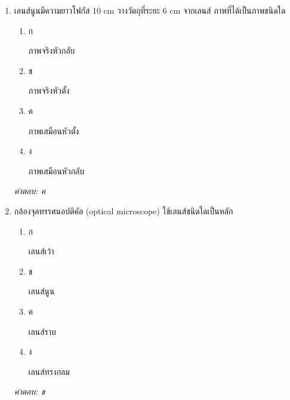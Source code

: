 \documentclass[12pt]{article}
\begin{document}
\begin{enumerate}[label=\arabic*., itemsep=0.5\baselineskip, topsep=0.5\baselineskip, leftmargin=*]
\item เลนส์นูนมีความยาวโฟกัส 10 cm วางวัตถุที่ระยะ 6 cm จากเลนส์ ภาพที่ได้เป็นภาพชนิดใด
\begin{enumerate}[label=\alph*)., itemsep=0.3\baselineskip, topsep=0.3\baselineskip]
\item ก\ 
\begin{minipage}[t]{0.9\linewidth}
\raggedright ภาพจริงหัวกลับ
\end{minipage}
\item ข\ 
\begin{minipage}[t]{0.9\linewidth}
\raggedright ภาพจริงหัวตั้ง
\end{minipage}
\item ค\ 
\begin{minipage}[t]{0.9\linewidth}
\raggedright ภาพเสมือนหัวตั้ง
\end{minipage}
\item ง\ 
\begin{minipage}[t]{0.9\linewidth}
\raggedright ภาพเสมือนหัวกลับ
\end{minipage}
\end{enumerate}
\vspace{-0.3\baselineskip}
\begin{small}
\textit{คำตอบ: ค}
\end{small}

\item กล้องจุลทรรศนอปติคัล (optical microscope) ใช้เลนส์ชนิดใดเป็นหลัก
\begin{enumerate}[label=\alph*)., itemsep=0.3\baselineskip, topsep=0.3\baselineskip]
\item ก\ 
\begin{minipage}[t]{0.9\linewidth}
\raggedright เลนส์เว้า
\end{minipage}
\item ข\ 
\begin{minipage}[t]{0.9\linewidth}
\raggedright เลนส์นูน
\end{minipage}
\item ค\ 
\begin{minipage}[t]{0.9\linewidth}
\raggedright เลนส์ราบ
\end{minipage}
\item ง\ 
\begin{minipage}[t]{0.9\linewidth}
\raggedright เลนส์ทรงกลม
\end{minipage}
\end{enumerate}
\vspace{-0.3\baselineskip}
\begin{small}
\textit{คำตอบ: ข}
\end{small}


\end{enumerate}
\end{document}
